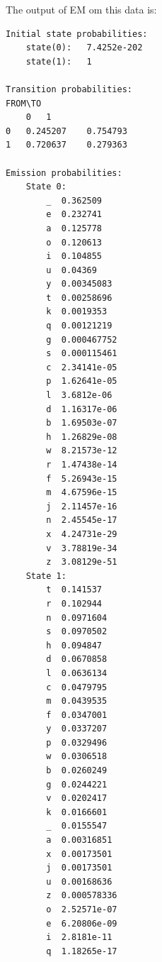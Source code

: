 \documentclass[a4paper,11pt]{article}
\begin{document}
The output of EM om this data is:
\begin{verbatim}
Initial state probabilities:
	state(0):	7.4252e-202
	state(1):	1

Transition probabilities:
FROM\TO
	0 	1 
0 	0.245207 	0.754793 
1 	0.720637 	0.279363 

Emission probabilities:
	State 0:
		_  0.362509
		e  0.232741
		a  0.125778
		o  0.120613
		i  0.104855
		u  0.04369
		y  0.00345083
		t  0.00258696
		k  0.0019353
		q  0.00121219
		g  0.000467752
		s  0.000115461
		c  2.34141e-05
		p  1.62641e-05
		l  3.6812e-06
		d  1.16317e-06
		b  1.69503e-07
		h  1.26829e-08
		w  8.21573e-12
		r  1.47438e-14
		f  5.26943e-15
		m  4.67596e-15
		j  2.11457e-16
		n  2.45545e-17
		x  4.24731e-29
		v  3.78819e-34
		z  3.08129e-51
	State 1:
		t  0.141537
		r  0.102944
		n  0.0971604
		s  0.0970502
		h  0.094847
		d  0.0670858
		l  0.0636134
		c  0.0479795
		m  0.0439535
		f  0.0347001
		y  0.0337207
		p  0.0329496
		w  0.0306518
		b  0.0260249
		g  0.0244221
		v  0.0202417
		k  0.0166601
		_  0.0155547
		a  0.00316851
		x  0.00173501
		j  0.00173501
		u  0.00168636
		z  0.000578336
		o  2.52571e-07
		e  6.20806e-09
		i  2.8181e-11
		q  1.18265e-17
\end{verbatim}
\end{document}
